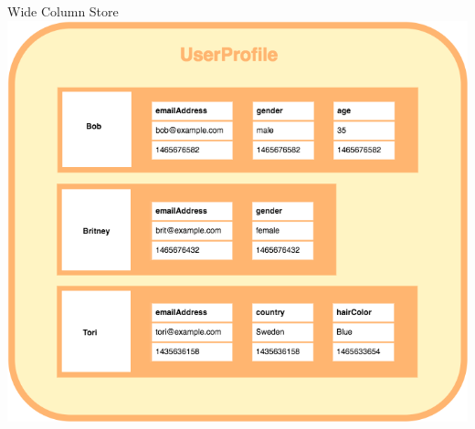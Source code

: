 \documentclass[
  10pt
]{beamer}
\begin{document}
\begin{frame}{Wide Column Store}
  \includegraphics[width=0.75\columnwidth]{resources/wide_column_store.png}
\end{frame}
\end{document}
